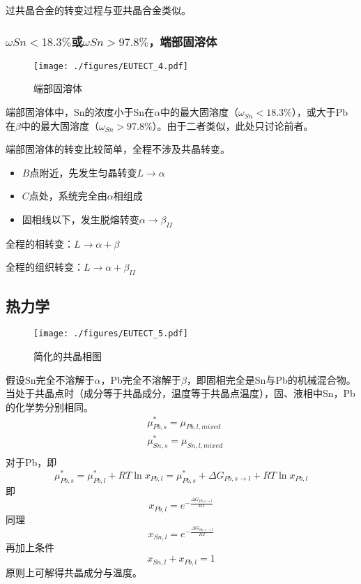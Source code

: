 过共晶合金的转变过程与亚共晶合金类似。

\subsubsection{$\omega Sn<18.3\%$或$\omega Sn>97.8\%$，端部固溶体}
\begin{figure}[ht]
\centering
\texttt{[image: ./figures/EUTECT\_4.pdf]}
\caption{端部固溶体} \label{EUTECT_fig4}
\end{figure}
端部固溶体中，Sn的浓度小于Sn在$\alpha$中的最大固溶度（$\omega_{Sn}<18.3\%$），或大于Pb在$\beta$中的最大固溶度（$\omega_{Sn}>97.8\%$）。由于二者类似，此处只讨论前者。

端部固溶体的转变比较简单，全程不涉及共晶转变。
\begin{itemize}
\item $B$点附近，先发生匀晶转变$L \rightarrow \alpha$
\item $C$点处，系统完全由$\alpha$相组成
\item 固相线以下，发生脱熔转变$\alpha \rightarrow \beta_{II}$
\end{itemize}

全程的相转变：$L \rightarrow \alpha+\beta$

全程的组织转变：$L \rightarrow \alpha+ \beta_{II}$

\subsection{热力学}
\begin{figure}[ht]
\centering
\texttt{[image: ./figures/EUTECT\_5.pdf]}
\caption{简化的共晶相图} \label{EUTECT_fig5}
\end{figure}
假设Sn完全不溶解于$\alpha$，Pb完全不溶解于$\beta$，即固相完全是Sn与Pb的机械混合物。当处于共晶点时（成分等于共晶成分，温度等于共晶点温度），固、液相中Sn，Pb的化学势分别相同。
\begin{align}
&\mu_{Pb,s}^*=\mu_{Pb,l,mixed}\\
&\mu_{Sn,s}^*=\mu_{Sn,l,mixed}\\
\end{align}
对于Pb，即
$$\mu_{Pb,s}^*=\mu_{Pb,l}^*+RT \ln x_{Pb,l}=\mu_{Pb,s}^*+\Delta G_{Pb, s\rightarrow l}+RT \ln x_{Pb,l}$$
即
\begin{equation}
x_{Pb,l}=e^{-\frac{\Delta G_{Pb, s\rightarrow l}}{RT}}
\end{equation}
同理
\begin{equation}
x_{Sn,l}=e^{-\frac{\Delta G_{Sn, s\rightarrow l}}{RT}}
\end{equation}
再加上条件
\begin{equation}
x_{Sn,l}+x_{Pb,l}=1
\end{equation}
原则上可解得共晶成分与温度。
